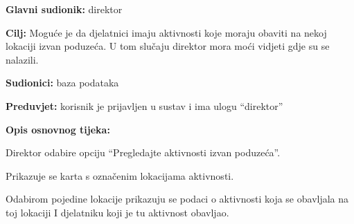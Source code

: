 			\begin{packed_item}
				\item \textbf{Glavni sudionik: } direktor
				\item  \textbf{Cilj:} Moguće je da djelatnici imaju aktivnosti koje moraju obaviti na nekoj lokaciji izvan poduzeća. U tom slučaju direktor mora moći vidjeti gdje su se nalazili. 
				\item  \textbf{Sudionici:} baza podataka
				\item  \textbf{Preduvjet:} korisnik je prijavljen u sustav i ima ulogu “direktor”
				\item  \textbf{Opis osnovnog tijeka:}
				\item[] \begin{packed_enum}
					\item Direktor odabire opciju “Pregledajte aktivnosti izvan poduzeća”. 
					\item Prikazuje se karta s označenim lokacijama aktivnosti. 
					\item Odabirom pojedine lokacije prikazuju se podaci o aktivnosti koja se obavljala na toj lokaciji I djelatniku koji je tu aktivnost obavljao. 
				\end{packed_enum}
			\end{packed_item}
